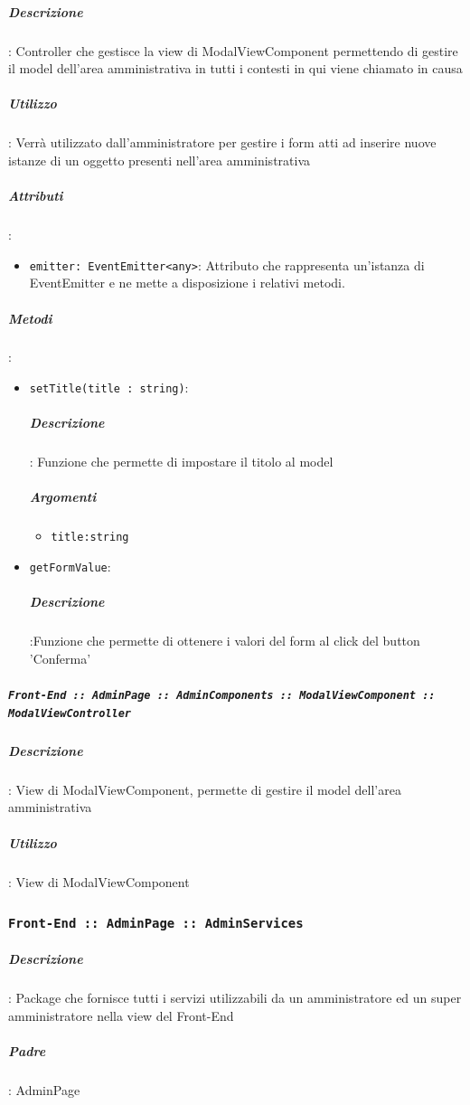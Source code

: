 \documentclass[../DefinizioneDiProdotto_v3.0.0.tex]{subfiles}
\begin{document}
					\subparagraph{Descrizione}: Controller che gestisce la view di ModalViewComponent permettendo di gestire il model dell'area amministrativa in tutti i contesti in qui viene chiamato in causa
					\subparagraph{Utilizzo}: Verrà utilizzato dall'amministratore per gestire i form atti ad inserire nuove istanze di un oggetto presenti nell'area amministrativa
					\subparagraph{Attributi}:
					      \begin{itemize}
			      	      	\item \texttt{emitter: EventEmitter<any>}: Attributo che rappresenta un'istanza di EventEmitter e ne mette a disposizione i relativi metodi.
			      	      \end{itemize}
					\subparagraph{Metodi}:
					      \begin{itemize}
			      	      	\item \texttt{setTitle(title : string)}:

							\subparagraph{Descrizione}: Funzione che permette di impostare il titolo al model
							\subparagraph{Argomenti}
							\begin{itemize}
								\item	\texttt{title:string}
							\end{itemize}
			      	      	\item \texttt{getFormValue}:
							\subparagraph{Descrizione}:Funzione che permette di ottenere i valori del form al click del button 'Conferma'
			      	      \end{itemize}\vspace{0.5em}

				\subparagraph{\texttt{Front-End :: AdminPage :: AdminComponents :: ModalViewComponent :: ModalViewController}}
					\subparagraph{Descrizione}: View di ModalViewComponent, permette di gestire il model dell'area amministrativa
					\subparagraph{Utilizzo}: View di ModalViewComponent


	\newpage
	\subsubsection{\texttt{Front-End :: AdminPage :: AdminServices}}

			\subparagraph{Descrizione}: Package che fornisce tutti i servizi utilizzabili da un amministratore ed un super amministratore nella view del Front-End
			\subparagraph{Padre}: AdminPage
\end{document}
